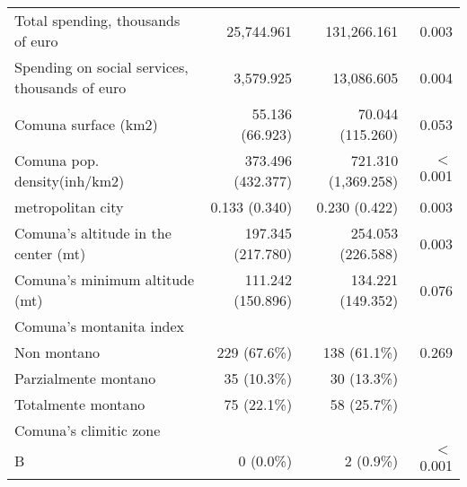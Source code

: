 \begin{table}[ht]
\begin{tabular}{llll}
\multicolumn{1}{l}{Total spending, thousands of euro} &
  \multicolumn{1}{r}{25,744.961} &
  \multicolumn{1}{r}{131,266.161} &
  \multicolumn{1}{r}{0.003} \\
\multicolumn{1}{l}{Spending on social services, thousands of euro} &
  \multicolumn{1}{r}{3,579.925} &
  \multicolumn{1}{r}{13,086.605} &
  \multicolumn{1}{r}{0.004} \\
\multicolumn{1}{l}{Comuna surface (km2)} &
  \multicolumn{1}{r}{55.136 (66.923)} &
  \multicolumn{1}{r}{70.044 (115.260)} &
  \multicolumn{1}{r}{0.053} \\
\multicolumn{1}{l}{Comuna pop. density(inh/km2)} &
  \multicolumn{1}{r}{373.496 (432.377)} &
  \multicolumn{1}{r}{721.310 (1,369.258)} &
  \multicolumn{1}{r}{$<$0.001} \\
\multicolumn{1}{l}{metropolitan city} &
  \multicolumn{1}{r}{0.133 (0.340)} &
  \multicolumn{1}{r}{0.230 (0.422)} &
  \multicolumn{1}{r}{0.003} \\
\multicolumn{1}{l}{Comuna's altitude in the center (mt)} &
  \multicolumn{1}{r}{197.345 (217.780)} &
  \multicolumn{1}{r}{254.053 (226.588)} &
  \multicolumn{1}{r}{0.003} \\
\multicolumn{1}{l}{Comuna's minimum altitude (mt)} &
  \multicolumn{1}{r}{111.242 (150.896)} &
  \multicolumn{1}{r}{134.221 (149.352)} &
  \multicolumn{1}{r}{0.076} \\
\multicolumn{1}{l}{Comuna's montanita index} &
  \multicolumn{1}{r}{} &
  \multicolumn{1}{r}{} &
  \multicolumn{1}{r}{} \\
\multicolumn{1}{l}{\hspace{1em}Non montano} &
  \multicolumn{1}{r}{229 (67.6\%)} &
  \multicolumn{1}{r}{138 (61.1\%)} &
  \multicolumn{1}{r}{0.269} \\
\multicolumn{1}{l}{\hspace{1em}Parzialmente montano} &
  \multicolumn{1}{r}{35 (10.3\%)} &
  \multicolumn{1}{r}{30 (13.3\%)} &
  \multicolumn{1}{r}{} \\
\multicolumn{1}{l}{\hspace{1em}Totalmente montano} &
  \multicolumn{1}{r}{75 (22.1\%)} &
  \multicolumn{1}{r}{58 (25.7\%)} &
  \multicolumn{1}{r}{} \\
\multicolumn{1}{l}{Comuna's climitic zone} &
  \multicolumn{1}{r}{} &
  \multicolumn{1}{r}{} &
  \multicolumn{1}{r}{} \\
\multicolumn{1}{l}{\hspace{1em}B} &
  \multicolumn{1}{r}{0 (0.0\%)} &
  \multicolumn{1}{r}{2 (0.9\%)} &
  \multicolumn{1}{r}{$<$0.001} \\

\end{tabular}
\end{table}
